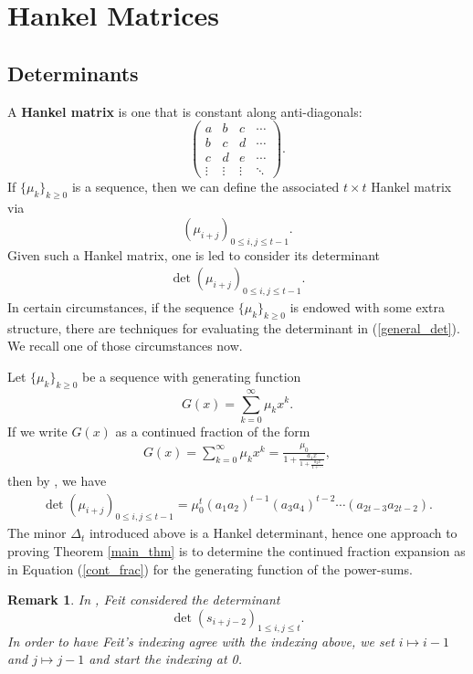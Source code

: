 \documentclass[10pt,a4paper]{amsart}
\newtheorem{rmk}[equation]{Remark}
\begin{document}
\section{Hankel Matrices}

\subsection{Determinants} A \textbf{Hankel matrix} is one that is constant along anti-diagonals:
\[
\begin{pmatrix} 
a & b & c & \cdots \\
b & c & d & \cdots \\
c & d & e &  \cdots \\
\vdots & \vdots & \vdots & \ddots
\end{pmatrix}.
\]
If $\lbrace \mu_k \rbrace_{k\geq 0}$ is a sequence, then we can define the associated $t \times t$ Hankel matrix via 
\[
\left( \mu_{i+j} \right)_{0 \leq i,j \leq t-1}.
\]
Given such a Hankel matrix, one is led to consider its determinant 
\begin{align} \label{general_det}
\det \left(\mu_{i+j}\right)_{0 \leq i,j \leq t-1}.
\end{align} 
In certain circumstances, if the sequence $\lbrace \mu_k \rbrace_{k \geq 0}$ is endowed with some extra structure, there are techniques for evaluating the determinant in (\ref{general_det}). We recall one of those circumstances now.

Let $\lbrace \mu_k \rbrace_{k \geq 0}$ be a sequence with generating function
\[
G(x) =  \sum_{k=0}^\infty \mu_kx^k.
\]
If we write $G(x)$ as a continued fraction of the form
\begin{align} \label{cont_frac}
G(x) = \sum_{k=0}^\infty \mu_kx^k  = \frac{\mu_0}{\displaystyle 1+  \frac{a_1x}{1+ \displaystyle \frac{a_2x}{1 + \cdots}}},
\end{align}
then by \cite[Thm.~30]{krattenhaler}, we have
\begin{align} \label{kratt_form}
\det \left( \mu_{i+j} \right)_{0 \leq i,j \leq t-1} = \mu_0^t \left( a_1a_2 \right)^{t-1}\left(a_3a_4 \right)^{t-2} \cdots \left(a_{2t-3}a_{2t-2}\right).
\end{align}
The minor $\Delta_{t}$ introduced above is a Hankel determinant, hence one approach to proving Theorem \ref{main_thm} is to determine the continued fraction expansion as in Equation (\ref{cont_frac}) for the generating function of the power-sums.

\begin{rmk}
In \cite{feit}, Feit considered the determinant 
\[
\det \left(s_{i+j-2} \right)_{1 \leq i,j \leq t}.
\]
In order to have Feit's indexing agree with the indexing above, we set $i \mapsto i-1$ and $j \mapsto j-1$ and start the indexing at 0.
\end{rmk}
\end{document}
